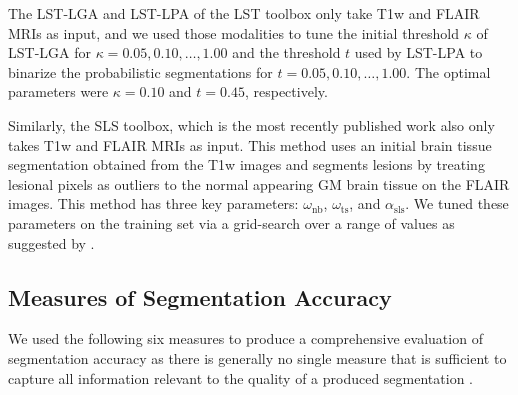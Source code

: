 The LST-LGA and LST-LPA of the LST toolbox only take T1w and FLAIR MRIs as
input, and we used those modalities to tune the initial threshold $\kappa$ of
LST-LGA for $\kappa = 0.05, 0.10, \dotsc, 1.00$ and the threshold $t$ used by
LST-LPA to binarize the probabilistic segmentations for $t = 0.05, 0.10, \dotsc,
1.00$. The optimal parameters were $\kappa = 0.10$ and $t = 0.45$, respectively.

Similarly, the SLS toolbox, which is the most recently published work
\citep{roura2015} also only takes T1w and FLAIR MRIs as input. This method uses
an initial brain tissue segmentation obtained from the T1w images and segments
lesions by treating lesional pixels as outliers to the normal appearing GM brain
tissue on the FLAIR images. This method has three key parameters:
$\omega_\text{nb}$, $\omega_\text{ts}$, and $\alpha_\text{sls}$. We tuned these
parameters on the training set via a grid-search over a range of values as
suggested by \citet{roura2015}.

\subsection[Measures of segmentation accuracy]{Measures of Segmentation
Accuracy}
 
We used the following six measures to produce a comprehensive evaluation
of segmentation accuracy as there is generally no single measure that is
sufficient to capture all information relevant to the quality of a produced
segmentation \citep{garcia2013review}.

